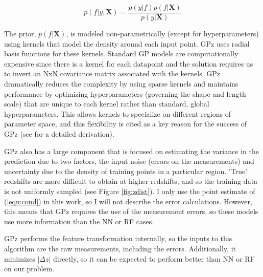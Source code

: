 \documentclass[13pt]{amsart}
\newcommand{\bX}{\textbf{X}}
\newcommand{\nequ}[2]{\begin{equation}#1 \label{#2}\end{equation}}
\newcommand{\equin}[1]{\(#1\)}
\begin{document}
      \nequ{p(f|y,\bX) = \frac{p(y|f) p(f|\bX)}{p(y|\bX)}}{equ:cond}

      The prior, \equin{p(f|\bX)}, is modeled non-parametrically (except for hyperparameters) using kernels that model the density around each input point. GPz uses radial basis functions for these kernels. Standard GP models are computationally expensive since there is a kernel for each datapoint and the solution requires us to invert an NxN covariance matrix associated with the kernels. GPz dramatically reduces the complexity by using sparse kernels and maintains performance by optimizing hyperparameters (governing the shape and length scale) that are unique to each kernel rather than standard, global hyperparameters. This allows kernels to specialize on different regions of parameter space, and this flexibility is cited as a key reason for the success of GPz (see \cite{sgp} for a detailed derivation).

      GPz also has a large component that is focused on estimating the variance in the prediction due to two factors, the input noise (errors on the measurements) and uncertainty due to the density of training points in a particular region. 'True' redshifts are more difficult to obtain at higher redshifts, and so the training data is not uniformly sampled (see Figure \ref{fig:zdist}). I only use the point estimate of (\ref{equ:cond}) in this work, so I will not describe the error calculations. However, this means that GPz requires the use of the measurement errors, so these models use more information than the NN or RF cases.

      GPz performs the feature transformation internally, so the inputs to this algorithm are the raw measurements, including the errors. Additionally, it minimizes
      \equin{| \Delta z |} directly, so it can be expected to perform better than NN or RF on our problem.
\end{document}
